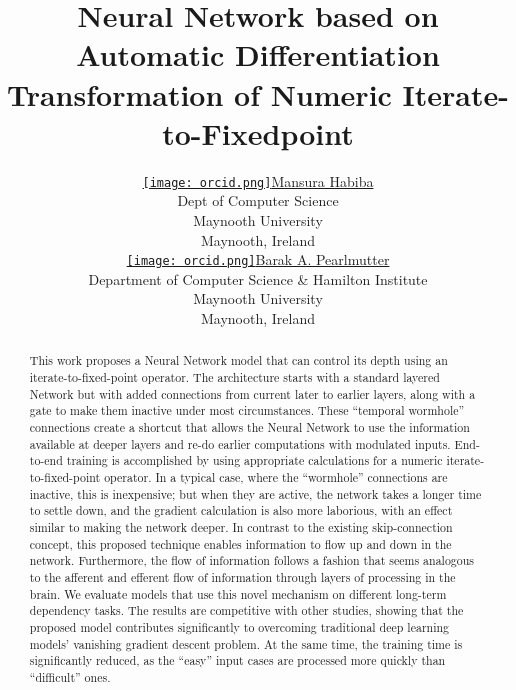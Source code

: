 \documentclass{article}
\begin{document}
\title{Neural Network based on Automatic Differentiation Transformation of Numeric Iterate-to-Fixedpoint}


\author{ 
	\href{https://orcid.org/0000-0001-9051-1370}{\texttt{[image: orcid.png]}\hspace{1mm}Mansura Habiba} \\
	Dept of Computer Science\\
	Maynooth University\\
	Maynooth, Ireland \\
	\And
	\href{https://orcid.org/0000-0003-0521-4553}{\texttt{[image: orcid.png]}\hspace{1mm}Barak A. Pearlmutter} \\
	Department of Computer Science \& Hamilton Institute\\
	Maynooth University\\
	Maynooth, Ireland \\
	
}


\maketitle

\begin{abstract}
    This work proposes a Neural Network model that can control its depth using an iterate-to-fixed-point operator. The architecture starts with a standard layered Network but with added connections from current later to earlier layers, along with a gate to make them inactive under most circumstances. These ``temporal wormhole'' connections create a shortcut that allows the Neural Network to use the information available at deeper layers and re-do earlier computations with modulated inputs. End-to-end training is accomplished by using appropriate calculations for a numeric iterate-to-fixed-point operator. In a typical case, where the ``wormhole'' connections are inactive, this is inexpensive; but when they are active, the network takes a longer time to settle down, and the gradient calculation is also more laborious, with an effect similar to making the network deeper. In contrast to the existing skip-connection concept, this proposed technique enables information to flow up and down in the network. Furthermore, the flow of information follows a fashion that seems analogous to the afferent and efferent flow of information through layers of processing in the brain. We evaluate models that use this novel mechanism on different long-term dependency tasks. The results are competitive with other studies, showing that the proposed model contributes significantly to overcoming traditional deep learning models' vanishing gradient descent problem. At the same time, the training time is significantly reduced, as the ``easy'' input cases are processed more quickly than ``difficult'' ones.
\end{abstract}
\end{document}
